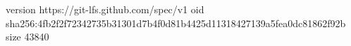 version https://git-lfs.github.com/spec/v1
oid sha256:4fb2f2f72342735b31301d7b4f0d81b4425d11318427139a5fea0dc81862f92b
size 43840

